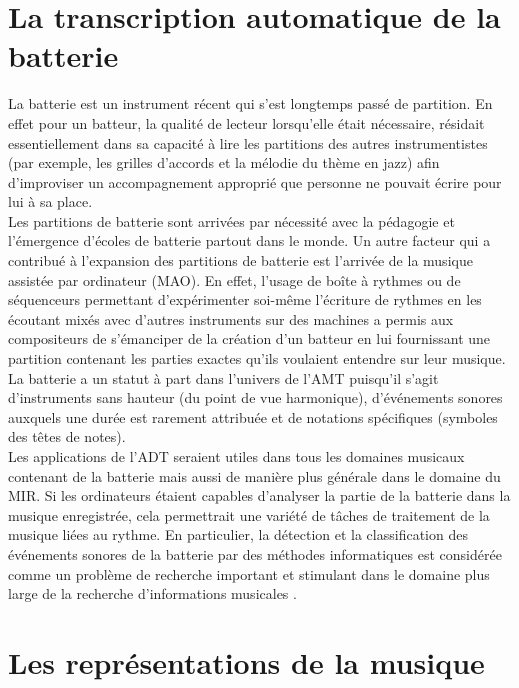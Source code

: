 \section{La transcription automatique de la batterie}
La batterie est un instrument récent qui s’est longtemps passé de partition. En effet pour un batteur, la qualité de lecteur lorsqu’elle était nécessaire, résidait essentiellement dans sa capacité à lire les partitions des autres instrumentistes (par exemple, les grilles d’accords et la mélodie du thème en jazz) afin d’improviser un accompagnement approprié que personne ne pouvait écrire pour lui à sa place.\\
Les partitions de batterie sont arrivées par nécessité avec la pédagogie et l’émergence d’écoles de batterie partout dans le monde. Un autre facteur qui a contribué à l’expansion des partitions de batterie est l’arrivée de la musique assistée par ordinateur (MAO). En effet, l’usage de boîte à rythmes ou de séquenceurs permettant d’expérimenter soi-même l’écriture de rythmes en les écoutant mixés avec d’autres instruments sur des machines a permis  aux compositeurs de s’émanciper de la création d’un batteur en lui fournissant une partition contenant les parties exactes qu’ils voulaient entendre sur leur musique.\\
La batterie a un statut à part dans l’univers de l’AMT puisqu'il s'agit d'instruments sans hauteur (du point de vue harmonique), d'événements sonores auxquels une durée est rarement attribuée et de notations spécifiques (symboles des têtes de notes).\\
Les applications de l’ADT seraient utiles dans tous les domaines musicaux contenant de la batterie mais aussi de manière plus générale dans le domaine du MIR. Si les ordinateurs étaient capables d'analyser la partie de la batterie dans la musique enregistrée, cela permettrait une variété de tâches de traitement de la musique liées au rythme. En particulier, la détection et la classification des événements sonores de la batterie par des méthodes informatiques est considérée comme un problème de recherche important et stimulant dans le domaine plus large de la recherche d'informations musicales \cite{8350302}.\\
\section{Les représentations de la musique}
